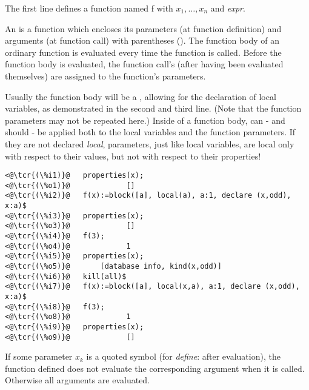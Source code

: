 \documentclass[../Maxima_Workbook.tex]{subfiles}
\begin{document}


\lz The first line defines a function named f with  $ x_1, \dots , x_n $ and  \emph{expr}.

\lz An  is a function which encloses its parameters (at function definition) and arguments (at function call) with parentheses (). The function body of an ordinary function is evaluated every time the function is called. Before the function body is evaluated, the function call's  (after having been evaluated themselves) are assigned to the function's parameters.

\lz Usually the function body will be a , allowing for the declaration of local variables, as demonstrated in the second and third line. (Note that the function parameters may not be repeated here.) Inside of a function body,  can - and should - be applied both to the local variables and the function parameters. If they are not declared \emph{local}, parameters, just like local variables, are local only with respect to their values, but not with respect to their properties!

\lz \begin{lstlisting}
<@\tcr{(\%i1)}@   properties(x);
<@\tcr{(\%o1)}@				[]
<@\tcr{(\%i2)}@   f(x):=block([a], local(a), a:1, declare (x,odd), x:a)$
<@\tcr{(\%i3)}@   properties(x);
<@\tcr{(\%o3)}@				[]
<@\tcr{(\%i4)}@   f(3);
<@\tcr{(\%o4)}@				1
<@\tcr{(\%i5)}@   properties(x);
<@\tcr{(\%o5)}@		  [database info, kind(x,odd)]
<@\tcr{(\%i6)}@   kill(all)$
<@\tcr{(\%i7)}@   f(x):=block([a], local(x,a), a:1, declare (x,odd), x:a)$
<@\tcr{(\%i8)}@   f(3);
<@\tcr{(\%o8)}@				1
<@\tcr{(\%i9)}@   properties(x);
<@\tcr{(\%o9)}@				[]
\end{lstlisting}

\lz If some parameter $ x_k $ is a quoted symbol (for \emph{define}: after evaluation), the function defined does not evaluate the corresponding argument when it is called. Otherwise all arguments are evaluated.
\end{document}
